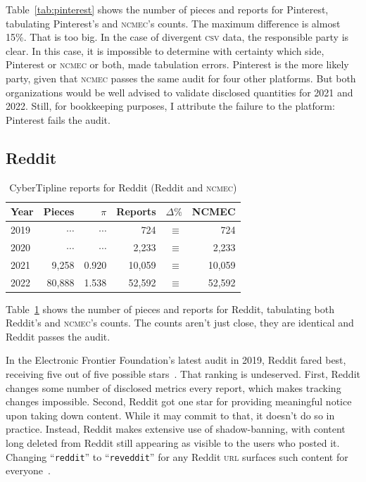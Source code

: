 \documentclass[nonacm,screen]{acmart}
\newcommand\V[1]{\textsc{\MakeLowercase{#1}}}
\begin{document}
\noindent{}Table~\ref{tab:pinterest} shows the number of pieces and reports for
Pinterest, tabulating Pinterest's and \V{NCMEC}'s counts. The maximum difference
is almost 15\%. That is too big. In the case of divergent \V{CSV} data, the
responsible party is clear. In this case, it is impossible to determine with
certainty which side, Pinterest or \V{NCMEC} or both, made tabulation errors.
Pinterest is the more likely party, given that \V{NCMEC} passes the same audit
for four other platforms. But both organizations would be well advised to
validate disclosed quantities for 2021 and 2022. Still, for bookkeeping
purposes, I attribute the failure to the platform: Pinterest fails the audit.


\subsection{Reddit}

\begin{table}[h!]
\centering\libertineLF
\caption{CyberTipline reports for Reddit (Reddit and \V{NCMEC})}
\label{tab:reddit}
\begin{tabular}{l|rr|rrr}
\textbf{Year}
& \textbf{Pieces} & \textbf{$\pi$} & \textbf{Reports}
& \textbf{$\Delta\%$} & \textbf{NCMEC} \\ \hline
2019 & $\cdots$ & $\cdots$ & 724 & $\equiv$ & 724 \\
2020 & $\cdots$ & $\cdots$ & 2,233 & $\equiv$ & 2,233 \\
2021 & 9,258 & 0.920 & 10,059 & $\equiv$ & 10,059 \\
2022 & 80,888 & 1.538 & 52,592 & $\equiv$ & 52,592 \\
\end{tabular}
\end{table}

\noindent{}Table~\ref{tab:reddit} shows the number of pieces and reports for
Reddit, tabulating both Reddit's and \V{NCMEC}'s counts. The counts aren't just
close, they are identical and Reddit passes the audit.

In the Electronic Frontier Foundation's latest audit in 2019, Reddit fared best,
receiving five out of five possible stars~\cite{CrockerGebhartea2019}. That
ranking is undeserved. First, Reddit changes some number of disclosed metrics
every report, which makes tracking changes impossible. Second, Reddit got one
star for providing meaningful notice upon taking down content. While it may
commit to that, it doesn't do so in practice. Instead, Reddit makes extensive
use of shadow-banning, with content long deleted from Reddit still appearing as
visible to the users who posted it. Changing ``\texttt{reddit}'' to
``\texttt{reveddit}'' for any Reddit \V{URL} surfaces such content for
everyone~\cite{Hawkins2023}.
\end{document}
